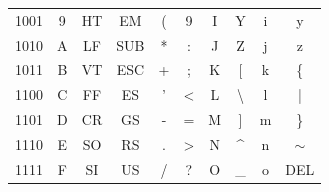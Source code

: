 \begin{table}[h!]
\begin{tabular}{|c|c|cccccccc|}
    1001           & {\color[HTML]{0000FF} 9}   & \multicolumn{1}{c|}{HT}                       & \multicolumn{1}{c|}{EM}                       & \multicolumn{1}{c|}{(}                        & \multicolumn{1}{c|}{9}                        & \multicolumn{1}{c|}{I}                        & \multicolumn{1}{c|}{Y}                        & \multicolumn{1}{c|}{i}                        & y                        \\ 
    1010           & {\color[HTML]{0000FF} A}   & \multicolumn{1}{c|}{LF}                       & \multicolumn{1}{c|}{SUB}                      & \multicolumn{1}{c|}{*}                        & \multicolumn{1}{c|}{:}                        & \multicolumn{1}{c|}{J}                        & \multicolumn{1}{c|}{Z}                        & \multicolumn{1}{c|}{j}                        & z                        \\ 
    1011           & {\color[HTML]{0000FF} B}   & \multicolumn{1}{c|}{VT}                       & \multicolumn{1}{c|}{ESC}                      & \multicolumn{1}{c|}{+}                        & \multicolumn{1}{c|}{;}                        & \multicolumn{1}{c|}{K}                        & \multicolumn{1}{c|}{{[}}                      & \multicolumn{1}{c|}{k}                        & \{                       \\ 
    1100           & {\color[HTML]{0000FF} C}   & \multicolumn{1}{c|}{FF}                       & \multicolumn{1}{c|}{ES}                       & \multicolumn{1}{c|}{'}                        & \multicolumn{1}{c|}{\textless{}}              & \multicolumn{1}{c|}{L}                        & \multicolumn{1}{c|}{\textbackslash{}}         & \multicolumn{1}{c|}{l}                        & |                        \\ 
    1101           & {\color[HTML]{0000FF} D}   & \multicolumn{1}{c|}{CR}                       & \multicolumn{1}{c|}{GS}                       & \multicolumn{1}{c|}{-}                        & \multicolumn{1}{c|}{=}                        & \multicolumn{1}{c|}{M}                        & \multicolumn{1}{c|}{{]}}                      & \multicolumn{1}{c|}{m}                        & \}                       \\ 
    1110           & {\color[HTML]{0000FF} E}   & \multicolumn{1}{c|}{SO}                       & \multicolumn{1}{c|}{RS}                       & \multicolumn{1}{c|}{.}                        & \multicolumn{1}{c|}{\textgreater{}}           & \multicolumn{1}{c|}{N}                        & \multicolumn{1}{c|}{\textasciicircum{}}       & \multicolumn{1}{c|}{n}                        & $\sim$                   \\ 
    1111           & {\color[HTML]{0000FF} F}   & \multicolumn{1}{c|}{SI}                       & \multicolumn{1}{c|}{US}                       & \multicolumn{1}{c|}{/}                        & \multicolumn{1}{c|}{?}                        & \multicolumn{1}{c|}{O}                        & \multicolumn{1}{c|}{\_}                       & \multicolumn{1}{c|}{o}                        & DEL                      \\ \hline
    \end{tabular}
\end{table}
